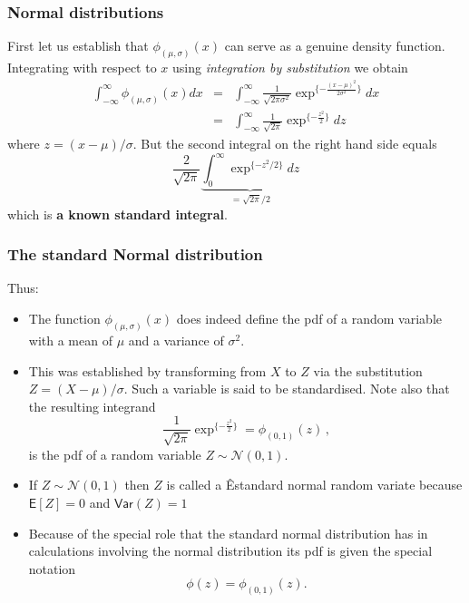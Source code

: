 \documentclass[notes=show,smaller,handout]{beamer}
\newcommand{\N}{\mathcal{N}}
\begin{document}
\begin{frame}%

\frametitle{Normal distributions}

First let us establish that $\phi_{(\mu,\sigma)}(x)$ can serve as a
genuine density function. Integrating with respect to $x$ using
\textit{integration by substitution} we obtain
\begin{eqnarray*}
\int_{-\infty}^{\infty}\phi_{(\mu,\sigma)}(x)dx&=&
\int_{-\infty}^{\infty}\frac{1}{\sqrt{2\pi\sigma^2}}\exp^{\{-\frac{(x-\mu)^2}{2\sigma^2}\}}dx
\\
 &=&\int_{-\infty}^{\infty}\frac{1}{\sqrt{2\pi}}\exp^{\{-\frac{z^2}{2}\}}dz
\end{eqnarray*}
where $z=(x-\mu)/\sigma$. But the second integral on the right
hand side equals
$$
\frac{2}{\sqrt{2\pi}}\underbrace{\int_0^{\infty}\exp^{\{-z^2/2\}}dz}_{={\sqrt{2\pi}} \big/ {2}}
$$
which is \textbf{a known standard integral}.
%
\end{frame}%

\begin{frame}%

\frametitle{The standard Normal distribution}

Thus:
\begin{itemize}
  \item The function $\phi_{(\mu,\sigma)}(x)$ does indeed define the pdf of a random variable with a mean of $\mu$ and a variance of $\sigma^2$.
\item This was established by transforming from $X$ to $Z$ via the substitution $Z=(X-\mu)/\sigma$. Such a variable
is said to be standardised. Note also that the resulting integrand
$$
\frac{1}{\sqrt{2\pi}}\exp^{\{-\frac{z^2}{2}\}}=\phi_{(0,1)}(z)\,,
$$
is the pdf of a random variable $Z\sim \N(0,1)$.
\item If $Z\sim \N(0,1)$ then $Z$ is called a \color{blue}Êstandard normal random variate \color{black} because
$
\textsf{E}[Z]=0$ and $\textsf{Var}(Z)=1$

\item Because of the special role that the standard normal distribution has in
calculations involving the normal distribution its pdf is given the special notation 
$$\phi(z)=\phi_{(0,1)}(z).$$
\end{itemize}

\end{frame}%
\end{document}
